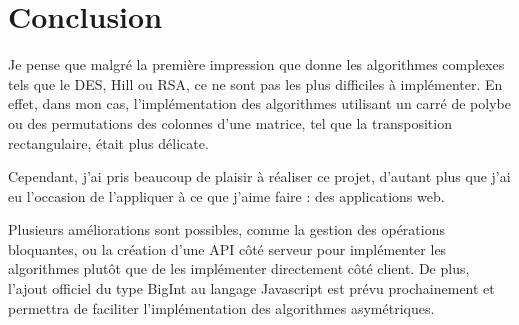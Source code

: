 \documentclass{article}
\begin{document}
\section{Conclusion}

Je pense que malgré la première impression que donne les algorithmes complexes tels que le DES, Hill ou RSA, ce ne sont pas les plus difficiles à implémenter. En effet, dans mon cas, l'implémentation des algorithmes utilisant un carré de polybe ou des permutations des colonnes d'une matrice, tel que la transposition rectangulaire, était plus délicate. 

Cependant, j'ai pris beaucoup de plaisir à réaliser ce projet, d'autant plus que j'ai eu l'occasion de l'appliquer à ce que j'aime faire : des applications web. 

Plusieurs améliorations sont possibles, comme la gestion des opérations bloquantes, ou la création d'une API côté serveur pour implémenter les algorithmes plutôt que de les implémenter directement côté client. De plus, l'ajout officiel du type BigInt au langage Javascript est prévu prochainement et permettra de faciliter l'implémentation des algorithmes asymétriques.



\end{document}

